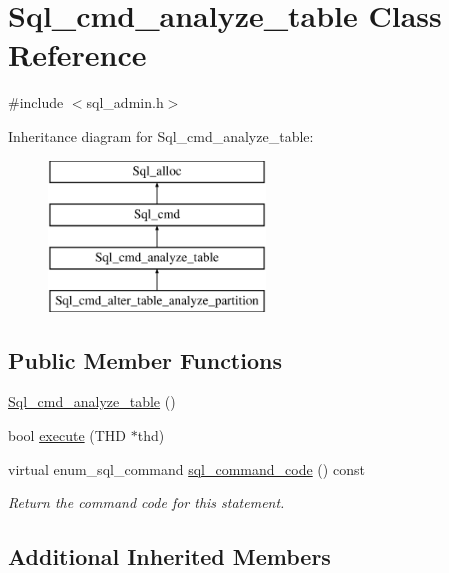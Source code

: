 \hypertarget{classSql__cmd__analyze__table}{}\section{Sql\+\_\+cmd\+\_\+analyze\+\_\+table Class Reference}
\label{classSql__cmd__analyze__table}


{\ttfamily \#include $<$sql\+\_\+admin.\+h$>$}

Inheritance diagram for Sql\+\_\+cmd\+\_\+analyze\+\_\+table\+:\begin{figure}[H]
\begin{center}
\leavevmode
\includegraphics[height=4.000000cm]{classSql__cmd__analyze__table}
\end{center}
\end{figure}
\subsection*{Public Member Functions}
\begin{DoxyCompactItemize}
\item 
\mbox{\hyperlink{classSql__cmd__analyze__table_a2d5b0a0710c28c4a45f914500ea2fb6e}{Sql\+\_\+cmd\+\_\+analyze\+\_\+table}} ()
\item 
bool \mbox{\hyperlink{classSql__cmd__analyze__table_ab6efba3102a2c21c273245fcd3de28e5}{execute}} (T\+HD $\ast$thd)
\item 
\mbox{\label{classSql__cmd__analyze__table_aaed202a354077efb0be21698d20c3e2f}} 
virtual enum\+\_\+sql\+\_\+command \mbox{\hyperlink{classSql__cmd__analyze__table_aaed202a354077efb0be21698d20c3e2f}{sql\+\_\+command\+\_\+code}} () const
\begin{DoxyCompactList}\small\item\em Return the command code for this statement. \end{DoxyCompactList}\end{DoxyCompactItemize}
\subsection*{Additional Inherited Members}


